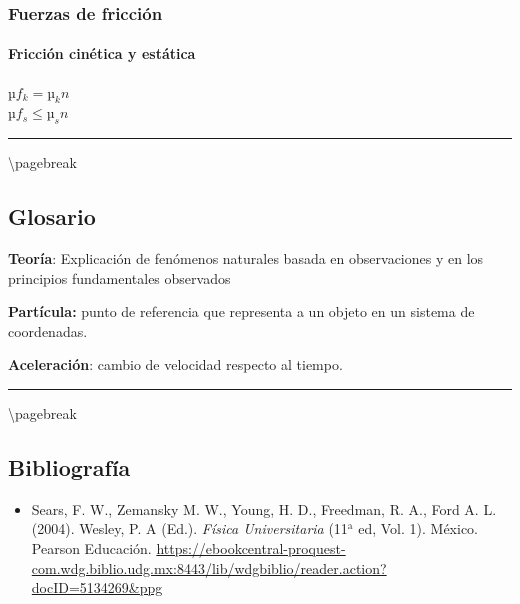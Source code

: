 \documentclass[
]{article}
\providecommand{\tightlist}{%
  \setlength{\itemsep}{0pt}\setlength{\parskip}{0pt}}
\begin{document}
\hypertarget{fuerzas-de-fricciuxf3n}{%
\subsubsection{Fuerzas de fricción}\label{fuerzas-de-fricciuxf3n}}

\hypertarget{fricciuxf3n-cinuxe9tica-y-estuxe1tica}{%
\paragraph{Fricción cinética y
estática}\label{fricciuxf3n-cinuxe9tica-y-estuxe1tica}}

{µ\(f_{k} = µ_{k}n\)}\\
{µ\(f_{s} \leq µ_{s}n\)}

\begin{center}\rule{0.5\linewidth}{0.5pt}\end{center}

\textbackslash pagebreak

\hypertarget{glosario}{%
\subsection{Glosario}\label{glosario}}

\textbf{Teoría}: Explicación de fenómenos naturales basada en
observaciones y en los principios fundamentales observados

\textbf{Partícula:} punto de referencia que representa a un objeto en un
sistema de coordenadas.

\textbf{Aceleración}: cambio de velocidad respecto al tiempo.

\begin{center}\rule{0.5\linewidth}{0.5pt}\end{center}

\textbackslash pagebreak

\hypertarget{bibliografuxeda}{%
\subsection{Bibliografía}\label{bibliografuxeda}}

\begin{itemize}
\tightlist
\item
  Sears, F. W., Zemansky M. W., Young, H. D., Freedman, R. A., Ford A.
  L. (2004). Wesley, P. A (Ed.). \emph{Física Universitaria}
  (11{\(^{\text{a}}\)} ed, Vol. 1). México. Pearson Educación.
  \url{https://ebookcentral-proquest-com.wdg.biblio.udg.mx:8443/lib/wdgbiblio/reader.action?docID=5134269\&ppg}
\end{itemize}
\end{document}
